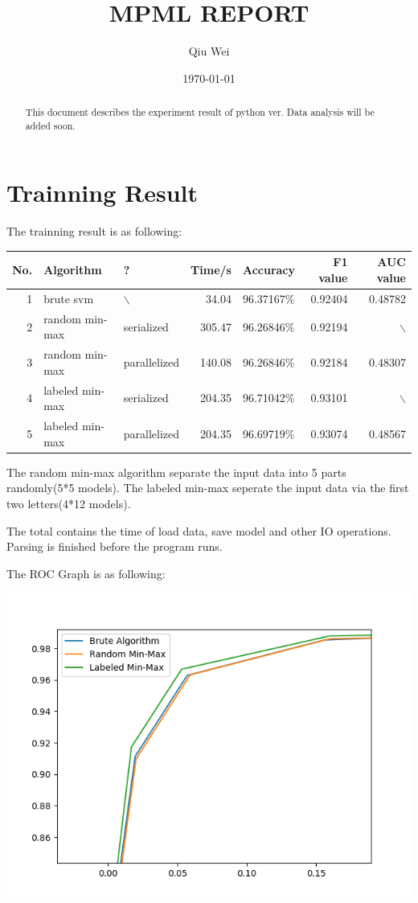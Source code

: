 \documentclass[11pt]{article}
\author{Qiu Wei}
\date{\today}
\title{MPML REPORT}
\begin{document}
\maketitle
\tableofcontents

\begin{abstract}
This document describes the experiment result of python ver.
Data analysis will be added soon.
\end{abstract}

\section{Trainning Result}
\label{sec-1}
The trainning result is as following:
\begin{center}
\begin{tabular}{rllrlrr}
\hline
No. & Algorithm & ? & Time/s & Accuracy & F1 value & AUC value\\
\hline
1 & brute svm & $\backslash$ & 34.04 & 96.37167\% & 0.92404 & 0.48782\\
2 & random min-max & serialized & 305.47 & 96.26846\% & 0.92194 & $\backslash$\\
3 & random min-max & parallelized & 140.08 & 96.26846\% & 0.92184 & 0.48307\\
4 & labeled min-max & serialized & 204.35 & 96.71042\% & 0.93101 & $\backslash$\\
5 & labeled min-max & parallelized & 204.35 & 96.69719\% & 0.93074 & 0.48567\\
\hline
\end{tabular}
\end{center}
The random min-max algorithm separate the input data into 5 parts randomly(5*5 models).
The labeled min-max seperate the input data via the first two letters(4*12 models).

The total contains the time of load data, save model and other IO operations.
Parsing is finished before the program runs.

The ROC Graph is as following:


\includegraphics[width=.9\linewidth]{figure_1.png}
\end{document}
